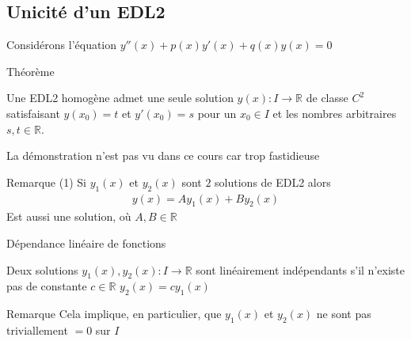     
    \subsection{Unicité d'un EDL2}
    Considérons l'équation $y''(x) + p(x)y'(x) + q(x)y(x) = 0$
    \begin{parag}{Théorème}
        \begin{theoreme}
        Une EDL2 homogène admet une seule solution $y(x) : I \to \mathbb{R}$ de classe $C^2$ satisfaisant $y(x_0) = t$ et $y'(x_0) = s$ pour un $x_0 \in I$ et les nombres arbitraires $s, t \in \mathbb{R}$.
        \end{theoreme}
        \begin{framedremark}
            La démonstration n'est pas vu dans ce cours car trop fastidieuse
        \end{framedremark}
       \begin{subparag}{Remarque}
           (1)  Si $y_1(x)$ et $y_2(x)$ sont $2$ solutions de EDL2  alors
           \begin{align*}
               y(x) = Ay_1(x) + By_2(x)
           \end{align*}
         Est aussi une solution, où $A, B \in \mathbb{R}$
           
       \end{subparag}
        
        

    
    \end{parag}
    
    
    \begin{parag}{Dépendance linéaire de fonctions}

    
        \begin{definition}
            Deux solutions $y_1(x), y_2(x) : I \to \mathbb{R}$ sont linéairement indépendants s'il n'existe pas de constante $c \in \mathbb{R}$  $y_2(x) = c y_1(x)$
            
        \end{definition}
        \begin{subparag}{Remarque}
            Cela implique, en particulier, que $y_1(x)$ et $y_2(x)$ ne sont pas triviallement $= 0$ sur $I$
            
        \end{subparag}
        
    \end{parag}
    
